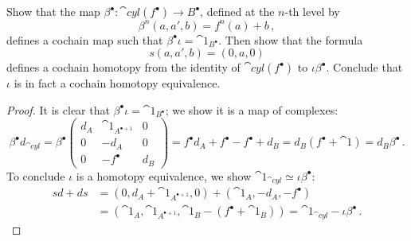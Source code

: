 \begin{exercise!}\label{cyl-equivalence}
    Show that the map $\beta^{\bullet} : \cat{cyl}(f^{\bullet}) \to B^{\bullet}$,
    defined at the $n$-th level by
    \begin{equation*}
        \beta^{n}(a,a',b) = f^{n}(a) + b\,,
    \end{equation*}
    defines a cochain map such that $\beta^{\bullet} \iota = \cat{1}_{B^{\bullet}}$.
    Then show that the formula
    \begin{equation*}
        s(a,a',b) = (0,a,0)
    \end{equation*}
    defines a cochain homotopy from the identity of $\cat{cyl}(f^{\bullet})$
    to $\iota \beta^{\bullet}$.
    Conclude that $\iota$ is in fact a cochain homotopy equivalence.
    \begin{proof}
        It is clear that $\beta^{\bullet}\iota = \cat{1}_{B^{\bullet}}$;
        we show it is a map of complexes:
        \begin{equation*}
            \beta^{\bullet} d_{\cat{cyl}} 
            = \beta^{\bullet} 
            \begin{pmatrix}
                d_{A} & \cat{1}_{A^{\bullet + 1}} & 0 \\
                0 & -d_{A} & 0 \\
                0 & -f^{\bullet} & d_{B}
            \end{pmatrix}
            =f^{\bullet}d_{A} + f^{\bullet} - f^{\bullet} + d_{B}
            = d_{B}(f^{\bullet} + \cat{1})
            = d_{B} \beta^{\bullet}\,.
        \end{equation*}
        To conclude $\iota$ is a homotopy equivalence,
        we show $\cat{1}_{\cat{cyl}} \simeq \iota\beta^{\bullet}$:
        \begin{align*}
            sd + ds
            &= (0, d_{A} + \cat{1}_{A^{\bullet+1}}, 0)
            + (\cat{1}_{A}, -d_{A}, -f^{\bullet})\\
            &= \left(\cat{1}_{A}, \cat{1}_{A^{\bullet+1}}, \cat{1}_{B} -(f^{\bullet}+\cat{1}_{B})\right)
            = \cat{1}_{\cat{cyl}} - \iota\beta^{\bullet}\,.
        \end{align*}
    \end{proof}
\end{exercise!}